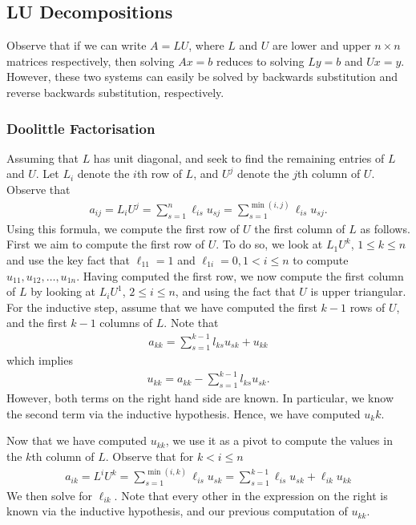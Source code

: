 \documentclass[12pt,reqno]{amsart}
\numberwithin{equation}{section}  %
\begin{document}
\subsection{LU Decompositions} 
Observe that if we can write $A = LU$, where
$L$ and $U$ are lower and upper $n \times n$ matrices respectively,
then solving $Ax = b$ reduces to solving $Ly = b$ and $Ux = y$.
However, these two systems can easily be solved by backwards substitution
and reverse backwards substitution, respectively.

\subsubsection{Doolittle Factorisation}
Assuming that $L$ has unit diagonal, and seek to find the remaining
entries of $L$ and $U$. Let $L_i$ denote the $i$th row of $L$,
and $U^j$ denote the $j$th column of $U$. Observe that
\begin{align*}
a_{ij} = L_i U^j = \sum_{s=1}^n \ell_{is} u_{sj} = \sum_{s=1}^{\min(i,j)} \ell_{is} u_{sj}.
\end{align*}
Using this formula, we compute the first row of $U$ 
the first column of $L$ as follows. First we aim to compute the first row of $U$.
To do so, we look at $L_1 U^k$, $1 \le k \le n$ and
use the key fact that $\ell_{11} = 1$ and $\ell_{1i} = 0, 1 < i \le n$
to compute $u_{11}, u_{12}, \ldots, u_{1n}$. 
Having computed the first row, we now compute the first column of $L$
by looking at $L_i U^1$, $2 \le i \le n$, and using the fact that
$U$ is upper triangular. 
For the inductive step, assume that we have computed the first $k-1$ rows
of $U$, and the first $k-1$ columns of $L$. Note that
\begin{align*}
a_{kk} = \sum_{s=1}^{k-1}l_{ks}u_{sk} + u_{kk}
\end{align*}
which implies
\begin{align*}
u_{kk} = a_{kk} - \sum_{s=1}^{k-1}l_{ks}u_{sk}.
\end{align*}
However, both terms on the right hand side are known. In particular,
we know the second term via the inductive hypothesis. Hence,
we have computed $u_kk$.

Now that we have computed $u_{kk}$, we use it as a pivot to compute
the values in the $k$th column of $L$. 
Observe that for $k < i \le n$
\begin{align*}
a_{ik} = L^i U^k = \sum_{s=1}^{\min(i,k)}\ell_{is}u_{sk}
= \sum_{s=1}^{k-1} \ell_{is} u_{sk} + \ell_{ik} u_{kk}
\end{align*}
We then solve for $\ell_{ik}$. Note that every other in the expression
on the right is known via the inductive hypothesis, and our previous
computation of $u_{kk}$.
\end{document}
